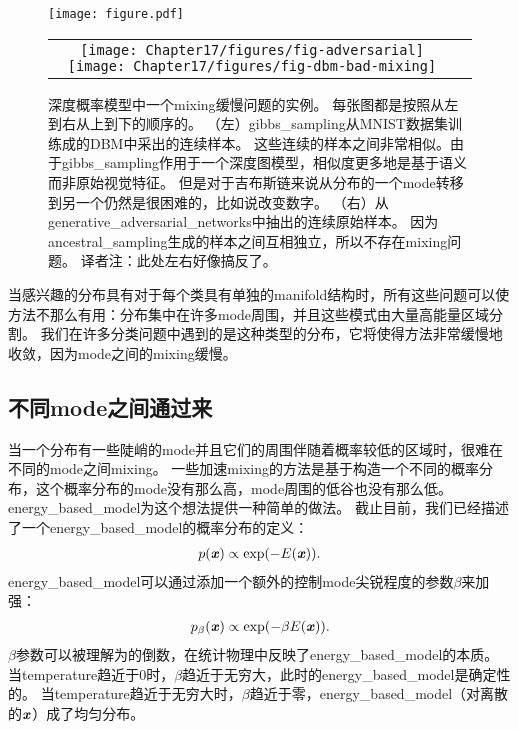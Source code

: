 \begin{figure}[!htb]
\ifOpenSource
\centerline{\texttt{[image: figure.pdf]}}
\else
    \centering
    \begin{tabular}{cc}
    \texttt{[image: Chapter17/figures/fig-adversarial]}
    \texttt{[image: Chapter17/figures/fig-dbm-bad-mixing]}
    \end{tabular}
\fi
	\caption{深度概率模型中一个\gls{mixing}缓慢问题的实例。
	每张图都是按照从左到右从上到下的顺序的。
	（左）\gls{gibbs_sampling}从MNIST数据集训练成的\gls{DBM}中采出的连续样本。
	这些连续的样本之间非常相似。由于\gls{gibbs_sampling}作用于一个深度图模型，相似度更多地是基于语义而非原始视觉特征。
	但是对于吉布斯链来说从分布的一个\gls{mode}转移到另一个仍然是很困难的，比如说改变数字。
	（右）从\gls{generative_adversarial_networks}中抽出的连续原始样本。
	因为\gls{ancestral_sampling}生成的样本之间互相独立，所以不存在\gls{mixing}问题。
	{译者注：此处左右好像搞反了。}}
	\label{fig:chap17_fig-dbm-bad-mixing}
\end{figure}


当感兴趣的分布具有对于每个类具有单独的\gls{manifold}结构时，所有这些问题可以使方法不那么有用：分布集中在许多\gls{mode}周围，并且这些模式由大量高能量区域分割。
我们在许多分类问题中遇到的是这种类型的分布，它将使得方法非常缓慢地收敛，因为\gls{mode}之间的\gls{mixing}缓慢。



\subsection{不同\gls{mode}之间通过来}
\label{sec:tempering_to_mix_between_modes}

当一个分布有一些陡峭的\gls{mode}并且它们的周围伴随着概率较低的区域时，很难在不同的\gls{mode}之间\gls{mixing}。
一些加速\gls{mixing}的方法是基于构造一个不同的概率分布，这个概率分布的\gls{mode}没有那么高，\gls{mode}周围的低谷也没有那么低。
\gls{energy_based_model}为这个想法提供一种简单的做法。
截止目前，我们已经描述了一个\gls{energy_based_model}的概率分布的定义：
\begin{align}
\label{eqn:1725}
p(\boldsymbol{\mathit{x}}) \propto \exp(-E(\boldsymbol{\mathit{x}})).
\end{align}
\gls{energy_based_model}可以通过添加一个额外的控制\gls{mode}尖锐程度的参数$\beta$来加强：
\begin{align}
\label{eqn:1726}
p_{\beta}(\boldsymbol{\mathit{x}}) \propto \exp(-\beta E(\boldsymbol{\mathit{x}})).
\end{align}
$\beta$参数可以被理解为的倒数，在统计物理中反映了\gls{energy_based_model}的本质。
当\gls{temperature}趋近于0时，$\beta$趋近于无穷大，此时的\gls{energy_based_model}是确定性的。
当\gls{temperature}趋近于无穷大时，$\beta$趋近于零，\gls{energy_based_model}（对离散的$\boldsymbol{\mathit{x}}$）成了均匀分布。

